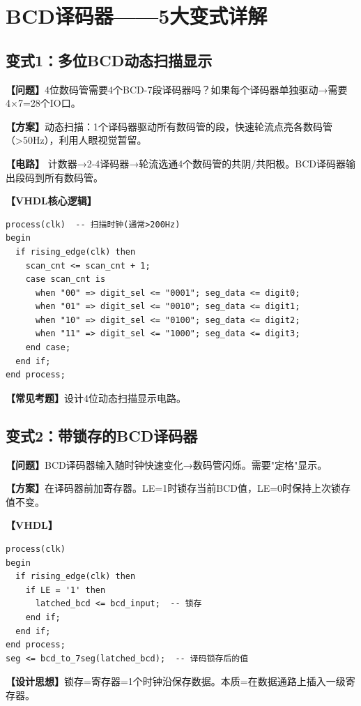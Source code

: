 \chapter{BCD译码器——5大变式详解}

\section{变式1：多位BCD动态扫描显示}

\begin{detailbox}[完整教学]
\textbf{【问题】}4位数码管需要4个BCD-7段译码器吗？如果每个译码器单独驱动→需要4×7=28个IO口。

\textbf{【方案】}动态扫描：1个译码器驱动所有数码管的段，快速轮流点亮各数码管（>50Hz），利用人眼视觉暂留。

\textbf{【电路】}
计数器→2-4译码器→轮流选通4个数码管的共阴/共阳极。BCD译码器输出段码到所有数码管。

\textbf{【VHDL核心逻辑】}
\begin{lstlisting}
process(clk)  -- 扫描时钟(通常>200Hz)
begin
  if rising_edge(clk) then
    scan_cnt <= scan_cnt + 1;
    case scan_cnt is
      when "00" => digit_sel <= "0001"; seg_data <= digit0;
      when "01" => digit_sel <= "0010"; seg_data <= digit1;
      when "10" => digit_sel <= "0100"; seg_data <= digit2;
      when "11" => digit_sel <= "1000"; seg_data <= digit3;
    end case;
  end if;
end process;
\end{lstlisting}

\textbf{【常见考题】}设计4位动态扫描显示电路。
\end{detailbox}


\section{变式2：带锁存的BCD译码器}

\begin{detailbox}[完整教学]
\textbf{【问题】}BCD译码器输入随时钟快速变化→数码管闪烁。需要"定格"显示。

\textbf{【方案】}在译码器前加寄存器。LE=1时锁存当前BCD值，LE=0时保持上次锁存值不变。

\textbf{【VHDL】}
\begin{lstlisting}
process(clk)
begin
  if rising_edge(clk) then
    if LE = '1' then
      latched_bcd <= bcd_input;  -- 锁存
    end if;
  end if;
end process;
seg <= bcd_to_7seg(latched_bcd);  -- 译码锁存后的值
\end{lstlisting}

\textbf{【设计思想】}锁存=寄存器=1个时钟沿保存数据。本质=在数据通路上插入一级寄存器。
\end{detailbox}


